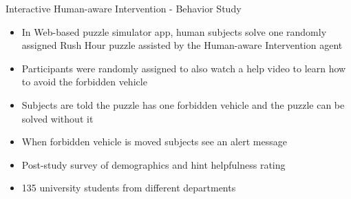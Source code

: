 \begin{frame}{Interactive Human-aware Intervention - Behavior Study}
\begin{itemize}
\item In Web-based puzzle simulator app, human subjects solve one randomly assigned Rush Hour puzzle assisted by the Human-aware Intervention agent
\item Participants were randomly assigned to also watch a help video to learn how to avoid the forbidden vehicle
\item Subjects are told the puzzle has one forbidden vehicle and the puzzle can be solved without it
\item When forbidden vehicle is moved subjects see an alert message
\item Post-study survey of demographics and hint helpfulness rating
\item 135 university students from different departments
\end{itemize}
\end{frame}
